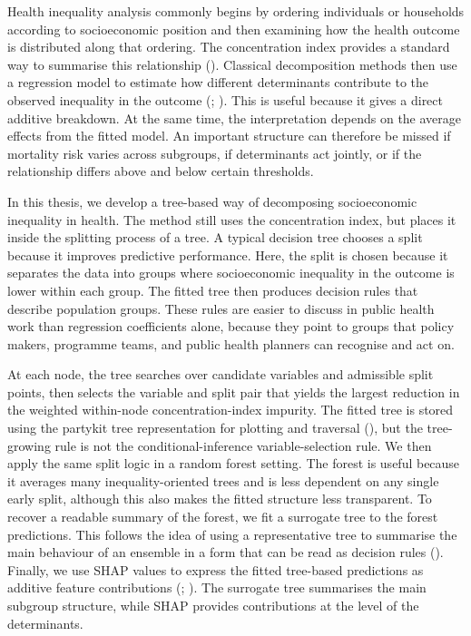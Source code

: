 \documentclass[
  11pt,
  a4paper,
]{article}
\begin{document}
Health inequality analysis commonly begins by ordering individuals or
households according to socioeconomic position and then examining how
the health outcome is distributed along that ordering. The concentration
index provides a standard way to summarise this relationship
(). Classical decomposition methods then use a regression
model to estimate how different determinants contribute to the observed
inequality in the outcome
(; ). This is useful because it gives a direct additive
breakdown. At the same time, the interpretation depends on the average
effects from the fitted model. An important structure can therefore be
missed if mortality risk varies across subgroups, if determinants act
jointly, or if the relationship differs above and below certain
thresholds.

In this thesis, we develop a tree-based way of decomposing socioeconomic
inequality in health. The method still uses the concentration index, but
places it inside the splitting process of a tree. A typical decision
tree chooses a split because it improves predictive performance. Here,
the split is chosen because it separates the data into groups where
socioeconomic inequality in the outcome is lower within each group. The
fitted tree then produces decision rules that describe population
groups. These rules are easier to discuss in public health work than
regression coefficients alone, because they point to groups that policy
makers, programme teams, and public health planners can recognise and
act on.

At each node, the tree searches over candidate variables and admissible
split points, then selects the variable and split pair that yields the
largest reduction in the weighted within-node concentration-index
impurity. The fitted tree is stored using the partykit tree
representation for plotting and traversal
(), but the
tree-growing rule is not the conditional-inference variable-selection
rule. We then apply the same split logic in a random forest setting. The
forest is useful because it averages many inequality-oriented trees and
is less dependent on any single early split, although this also makes
the fitted structure less transparent. To recover a readable summary of
the forest, we fit a surrogate tree to the forest predictions. This
follows the idea of using a representative tree to summarise the main
behaviour of an ensemble in a form that can be read as decision rules
(). Finally, we use SHAP values to express the fitted
tree-based predictions as additive feature contributions
(;
). The
surrogate tree summarises the main subgroup structure, while SHAP
provides contributions at the level of the determinants.
\end{document}
